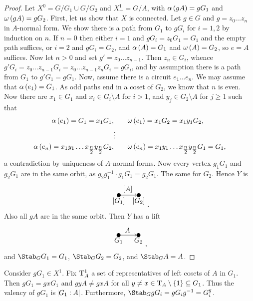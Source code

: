 \begin{proof}
Let $ X^0 = G / G_1 \cup G / G_2 $ and $ X_+^1 = G / A $, with $ \alpha\br{gA} = gG_1 $ and $ \omega\br{gA} = gG_2 $. First, let us show that $ X $ is connected. Let $ g \in G $ and $ g = z_0 \dots z_n $ in $ A $-normal form. We show there is a path from $ G_1 $ to $ gG_i $ for $ i = 1, 2 $ by induction on $ n $. If $ n = 0 $ then either $ i = 1 $ and $ gG_i = z_0G_1 = G_1 $ and the empty path suffices, or $ i = 2 $ and $ gG_i = G_2 $, and $ \alpha\br{A} = G_1 $ and $ \omega\br{A} = G_2 $, so $ e = A $ suffices. Now let $ n > 0 $ and set $ g' = z_0 \dots z_{n - 1} $. Then $ z_n \in G_i $, whence $ g'G_i = z_0 \dots z_{n - 1}G_i = z_0 \dots z_{n - 1}z_nG_i = gG_i $, and by assumption there is a path from $ G_1 $ to $ g'G_1 = gG_1 $. Now, assume there is a circuit $ e_1 \dots e_n $. We may assume that $ \alpha\br{e_1} = G_1 $. As odd paths end in a coset of $ G_2 $, we know that $ n $ is even. Now there are $ x_1 \in G_1 $ and $ x_i \in G_i \setminus A $ for $ i > 1 $, and $ y_j \in G_2 \setminus A $ for $ j \ge 1 $ such that
\begin{align*}
\alpha\br{e_1} = G_1 = x_1G_1, & \qquad \omega\br{e_1} = x_1G_2 = x_1y_1G_2, \\
& \vdots \\
\alpha\br{e_n} = x_1y_1 \dots x_{\tfrac{n}{2}}y_{\tfrac{n}{2}}G_2, & \qquad \omega\br{e_n} = x_1y_1 \dots x_{\tfrac{n}{2}}y_{\tfrac{n}{2}}G_1 = G_1,
\end{align*}
a contradiction by uniqueness of $ A $-normal forms. Now every vertex $ g_1G_1 $ and $ g_2G_1 $ are in the same orbit, as $ g_2g_1^{-1} \cdot g_1G_1 = g_2G_1 $. The same for $ G_2 $. Hence $ Y $ is
$$
\begin{tikzpicture}
\fill (0, 0) circle (0.1) node[below]{$ \sbr{G_1} $};
\fill (1, 0) circle (0.1) node[below]{$ \sbr{G_2} $};
\draw [->] (0, 0) to node[above]{$ \sbr{A} $} (0.9, 0);
\end{tikzpicture}.
$$
Also all $ gA $ are in the same orbit. Then $ Y $ has a lift
$$
\begin{tikzpicture}
\fill (0, 0) circle (0.1) node[below]{$ G_1 $};
\fill (1, 0) circle (0.1) node[below]{$ G_2 $};
\draw [->] (0, 0) to node[above]{$ A $} (0.9, 0);
\end{tikzpicture},
$$
and $ \Stab_G G_1 = G_1 $, $ \Stab_G G_2 = G_2 $, and $ \Stab_G A = A $.
\end{proof}


\begin{remark}
\label{rem:3.3.3}
Consider $ gG_1 \in X^1 $. Fix $ \mathrm{T}_A^1 $ a set of representatives of left cosets of $ A $ in $ G_1 $. Then $ gG_1 = gxG_1 $ and $ gyA \ne gxA $ for all $ y \ne x \in \T_A \setminus \cbr{1} \subseteq G_1 $. Thus the valency of $ gG_1 $ is $ \abs{G_1 : A} $. Furthermore, $ \Stab_G gG_i = gG_ig^{-1} = G_i^g $.
\end{remark}


